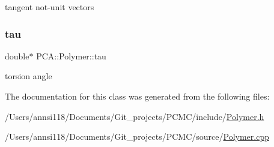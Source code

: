 tangent not-\/unit vectors 

\hypertarget{class_p_c_a_1_1_polymer_ab3b07298bdbac01a7b20b2554d7b248f}{}\label{class_p_c_a_1_1_polymer_ab3b07298bdbac01a7b20b2554d7b248f} 
\subsubsection{\texorpdfstring{tau}{tau}}
{\footnotesize\ttfamily double$\ast$ P\+C\+A\+::\+Polymer\+::tau\hspace{0.3cm}{\ttfamily [protected]}}



torsion angle 



The documentation for this class was generated from the following files\+:\begin{DoxyCompactItemize}
\item 
/\+Users/annsi118/\+Documents/\+Git\+\_\+projects/\+P\+C\+M\+C/include/\hyperlink{_polymer_8h}{Polymer.\+h}\item 
/\+Users/annsi118/\+Documents/\+Git\+\_\+projects/\+P\+C\+M\+C/source/\hyperlink{_polymer_8cpp}{Polymer.\+cpp}\end{DoxyCompactItemize}
